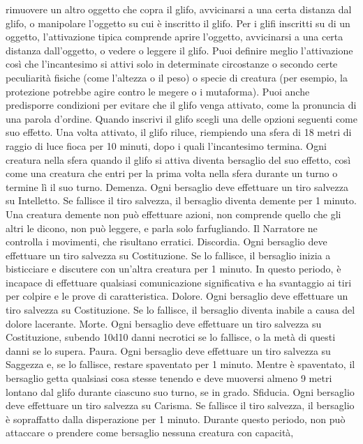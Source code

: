 \begin{multicols}{2}
rimuovere un altro oggetto che copra il glifo, avvicinarsi
a una certa distanza dal glifo, o manipolare l’oggetto su
cui è inscritto il glifo.
Per i glifi inscritti su di un oggetto, l’attivazione tipica
comprende aprire l’oggetto, avvicinarsi a una certa
distanza dall’oggetto, o vedere o leggere il glifo.
Puoi definire meglio l’attivazione così che l’incantesimo
si attivi solo in determinate circostanze o secondo certe
peculiarità fisiche (come l’altezza o il peso) o specie di
creatura (per esempio, la protezione potrebbe agire
contro le megere o i mutaforma). Puoi anche
predisporre condizioni per evitare che il glifo venga
attivato, come la pronuncia di una parola d’ordine.
Quando inscrivi il glifo scegli una delle opzioni seguenti
come suo effetto. Una volta attivato, il glifo riluce,
riempiendo una sfera di 18 metri di raggio di luce fioca
per 10 minuti, dopo i quali l’incantesimo termina. Ogni
creatura nella sfera quando il glifo si attiva diventa
bersaglio del suo effetto, così come una creatura che
entri per la prima volta nella sfera durante un turno o
termine lì il suo turno.
Demenza. Ogni bersaglio deve effettuare un tiro
salvezza su Intelletto. Se fallisce il tiro salvezza, il
bersaglio diventa demente per 1 minuto. Una creatura
demente non può effettuare azioni, non comprende
quello che gli altri le dicono, non può leggere, e parla
solo farfugliando. Il Narratore ne controlla i movimenti, che
risultano erratici.
Discordia. Ogni bersaglio deve effettuare un tiro
salvezza su Costituzione. Se lo fallisce, il bersaglio
inizia a bisticciare e discutere con un’altra creatura per
1 minuto. In questo periodo, è incapace di effettuare
qualsiasi comunicazione significativa e ha svantaggio ai
tiri per colpire e le prove di caratteristica.
Dolore. Ogni bersaglio deve effettuare un tiro salvezza
su Costituzione. Se lo fallisce, il bersaglio diventa
inabile a causa del dolore lacerante.
Morte. Ogni bersaglio deve effettuare un tiro salvezza
su Costituzione, subendo 10d10 danni necrotici se lo
fallisce, o la metà di questi danni se lo supera.
Paura. Ogni bersaglio deve effettuare un tiro salvezza
su Saggezza e, se lo fallisce, restare spaventato per 1
minuto. Mentre è spaventato, il bersaglio getta qualsiasi
cosa stesse tenendo e deve muoversi almeno 9 metri
lontano dal glifo durante ciascuno suo turno, se in
grado.
Sfiducia. Ogni bersaglio deve effettuare un tiro
salvezza su Carisma. Se fallisce il tiro salvezza, il
bersaglio è sopraffatto dalla disperazione per 1 minuto.
Durante questo periodo, non può attaccare o prendere
come bersaglio nessuna creatura con capacità,

\end{multicols}

